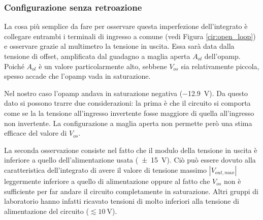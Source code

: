 \subsubsection{Configurazione senza retroazione}

La cosa più semplice da fare per osservare questa imperfezione dell'integrato è collegare entrambi i terminali di ingresso a comune (vedi Figura \ref{cir:open_loop}) e osservare grazie al multimetro la tensione in uscita.
Essa sarà data dalla tensione di offset, amplificata dal guadagno a maglia aperta $A_{ol}$ dell'opamp.
Poiché $A_{ol}$ è un valore particolarmente alto, sebbene $V_{os}$ sia relativamente piccola, spesso accade che l'opamp vada in saturazione.

Nel nostro caso l'opamp andava in saturazione negativa (\SI{-12.9}{\volt}).
Da questo dato si possono trarre due considerazioni: la prima è che il circuito si comporta come se la la tensione all'ingresso invertente fosse maggiore di quella all'ingresso non invertente.
La configurazione a maglia aperta non permette però una stima efficace del valore di $V_{os}$.

La seconda osservazione consiste nel fatto che il modulo della tensione in uscita è inferiore a quello dell'alimentazione usata (\SI{\pm15}{\volt}).
Ciò può essere dovuto alla caratteristica dell'integrato di avere il valore di tensione massimo $|V_{out,max}|$ leggermente inferiore a quello di alimentazione oppure al fatto che $V_{os}$ non è sufficiente per far andare il circuito completamente in saturazione.
Altri gruppi di laboratorio hanno infatti ricavato tensioni di molto inferiori alla tensione di alimentazione del circuito ($\lesssim \SI{10}{\volt}$).

